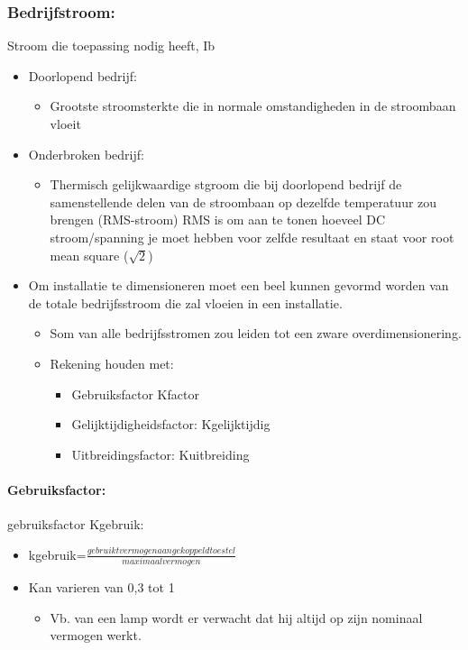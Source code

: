 \documentclass[12pt]{article}
\begin{document}
\subsubsection{Bedrijfstroom:}
Stroom die toepassing nodig heeft, Ib\begin{itemize}
    \item Doorlopend bedrijf:\begin{itemize}
        \item Grootste stroomsterkte die in normale omstandigheden in de stroombaan vloeit
    \end{itemize}
    \item Onderbroken bedrijf:\begin{itemize}
        \item Thermisch gelijkwaardige stgroom die bij doorlopend bedrijf de samenstellende delen van de stroombaan op dezelfde temperatuur zou brengen (RMS-stroom)
        RMS is om aan te tonen hoeveel DC stroom/spanning je moet hebben voor zelfde resultaat en staat voor root mean square ($\sqrt{2}$)
    \end{itemize}
    \item Om installatie te dimensioneren moet een beel kunnen gevormd worden van de totale bedrijfsstroom die zal vloeien in een installatie.\begin{itemize}
        \item Som van alle bedrijfsstromen zou leiden tot een zware overdimensionering.
        \item Rekening houden met:\begin{itemize}
            \item Gebruiksfactor Kfactor
            \item Gelijktijdigheidsfactor: Kgelijktijdig
            \item Uitbreidingsfactor: Kuitbreiding
        \end{itemize}
    \end{itemize}
\end{itemize}
\paragraph{Gebruiksfactor:}
gebruiksfactor Kgebruik:\begin{itemize}
    \item kgebruik=$\frac{gebruikt vermogen aangekoppeld toestel}{maximaal vermogen}$
    \item Kan varieren van 0,3 tot 1\begin{itemize}
        \item Vb. van een lamp wordt er verwacht dat hij altijd op zijn nominaal vermogen werkt.
    \end{itemize}
\end{itemize}
\end{document}
